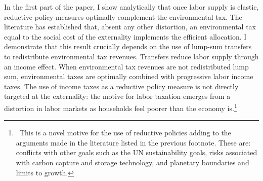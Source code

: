 
In the first part of the paper, I show analytically that once 
labor supply is elastic, reductive policy measures optimally complement the environmental tax. 
The literature has established that, absent any other distortion, an environmental tax equal to the social cost of the externality implements the efficient allocation. 
I demonstrate that this result crucially depends on the use of lump-sum transfers to redistribute environmental tax revenues. Transfers reduce labor supply through an income effect. %
When environmental tax revenues are not redistributed lump sum, environmental taxes are optimally combined with progressive labor income taxes. The use of income taxes as a reductive policy measure is not directly targeted at the externality: the motive for labor taxation emerges from a distortion in labor markets as households feel poorer than the economy is.\footnote{\ This is a novel motive for the use of reductive policies adding to the arguments made in the literature listed in the previous footnote. These are: conflicts with other goals such as the UN sustainability goals, risks associated with carbon capture and storage technology, and planetary boundaries and limits to growth.} %

